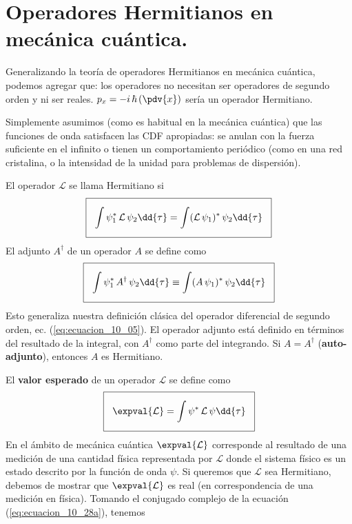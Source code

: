\section{Operadores Hermitianos en mecánica cuántica.}
Generalizando la teoría de operadores Hermitianos en mecánica cuántica, podemos agregar que: los operadores no necesitan ser operadores de segundo orden y ni ser reales. $\displaystyle p_{x} = - i \, \hbar \left(\pdv{x}\right)$ sería un operador Hermitiano.
\par
Simplemente asumimos (como es habitual en la mecánica cuántica) que las funciones de onda satisfacen las CDF apropiadas: se anulan con la fuerza suficiente en el infinito o tienen un comportamiento periódico (como en una red cristalina, o la intensidad de la unidad para problemas de dispersión). 
\par
El operador $\mathcal{L}$ se llama Hermitiano si
\begin{align}
\setlength{\fboxsep}{3\fboxsep}\boxed{\int \psi_{1}^{*} \, \mathcal{L} \, \psi_{2} \dd{\tau} =  \int (\mathcal{L} \, \psi_{1})^{*} \, \psi_{2} \dd{\tau}}
\label{eq:ecuacion_10_26}
\end{align}
El adjunto $A^{\dagger}$ de un operador $A$ se define como 
\begin{align}
\setlength{\fboxsep}{3\fboxsep}\boxed{\int \psi_{1}^{*} \, A^{\dagger} \, \psi_{2} \dd{\tau} \equiv \int (A \, \psi_{1})^{*} \, \psi_{2} \dd{\tau}}
\label{eq:ecuacion_10_27}
\end{align}
Esto generaliza nuestra definición clásica del operador diferencial de segundo orden, ec. (\ref{eq:ecuacion_10_05}). El operador adjunto está definido en términos del resultado de la integral, con $A^{\dagger}$ como parte del integrando. Si $A = A^{\dagger}$ (\textbf{auto-adjunto}), entonces $A$ es Hermitiano. %
\par
El \textbf{valor esperado} de un operador $\mathcal{L}$ se define como
\begin{align}
\setlength{\fboxsep}{3\fboxsep}\boxed{\expval{\mathcal{L}} = \int \psi^{*} \, \mathcal{L} \, \psi \dd{\tau}}
\label{eq:ecuacion_10_28a}
\end{align}
En el ámbito de mecánica cuántica $\expval{\mathcal{L}}$ corresponde al resultado de una medición de una cantidad física representada por $\mathcal{L}$ donde el sistema físico es un estado descrito por la función de onda $\psi$. Si queremos que $\mathcal{L}$ sea Hermitiano, debemos de mostrar que $\expval{\mathcal{L}}$ es real (en correspondencia de una medición en física). Tomando el conjugado complejo de la ecuación (\ref{eq:ecuacion_10_28a}), tenemos
